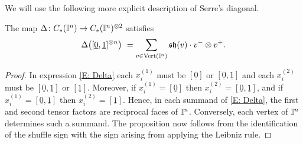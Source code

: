We will use the following more explicit description of Serre's diagonal.

\begin{proposition} \label{P: diagonal in terms of vertices}
	The map $\Delta \colon C_{\ast}(\mathbb{I}^n) \to C_{\ast}(\mathbb{I}^n)^{\otimes 2}$ satisfies
	\begin{equation*}
	\Delta \big([\underline 0, \underline 1]^{\otimes n}\big) \ =
	\sum_{v \in {\rm Vert}(\mathbb{I}^n)} \mathfrak{sh}(v) \cdot v^- \otimes v^+.
	\end{equation*}
\end{proposition}

\begin{proof}
	In expression \eqref{E: Delta} each $x_i^{(1)}$ must be $[\underline 0]$ or $[\underline 0, \underline 1]$ and each $x_i^{(2)}$ must be $[\underline 0, \underline 1]$ or $[\underline 1]$. 
	Moreover, if $x_i^{(1)} = [\underline 0]$ then $x_i^{(2)} = [\underline 0, \underline 1]$, and if $x_i^{(1)} = [\underline 0, \underline 1]$ then $x_i^{(2)} = [\underline 1]$.
	Hence, in each summand of \eqref{E: Delta}, the first and second tensor factors are reciprocal faces of $\mathbb{I}^n$. Conversely, each vertex of $\mathbb{I}^n$ determines such a summand.
	The proposition now follows from the identification of the shuffle sign with the sign arising from applying the Leibniz rule.
\end{proof}

